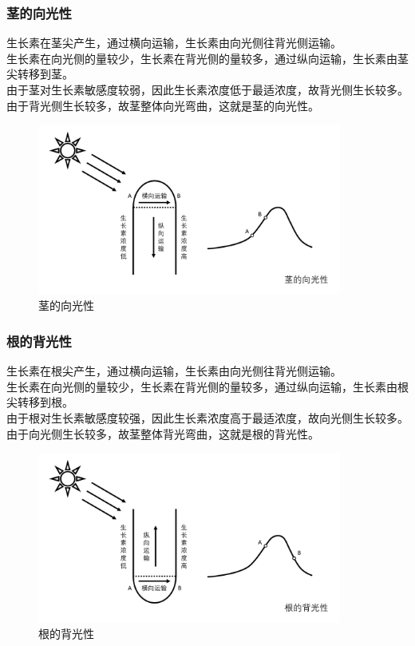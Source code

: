 \documentclass[UTF8]{ctexart}
\begin{document}
\newpage

\subsubsection{茎的向光性}
    生长素在茎尖产生，通过横向运输，生长素由向光侧往背光侧运输。\\[3mm]
    生长素在向光侧的量较少，生长素在背光侧的量较多，通过纵向运输，生长素由茎尖转移到茎。\\[3mm]
    由于茎对生长素敏感度较弱，因此生长素浓度低于最适浓度，故背光侧生长较多。\\[3mm]
    由于背光侧生长较多，故茎整体向光弯曲，这就是茎的向光性。
    \begin{figure}[h]
        \begin{center}
            \includegraphics[width=10cm]{BiologyImage/17.jpg}
            \caption{茎的向光性}
        \end{center}
    \end{figure}\vspace{-25pt}

\subsubsection{根的背光性}
    生长素在根尖产生，通过横向运输，生长素由向光侧往背光侧运输。\\[3mm]
    生长素在向光侧的量较少，生长素在背光侧的量较多，通过纵向运输，生长素由根尖转移到根。\\[3mm]
    由于根对生长素敏感度较强，因此生长素浓度高于最适浓度，故向光侧生长较多。\\[3mm]
    由于向光侧生长较多，故茎整体背光弯曲，这就是根的背光性。
    \begin{figure}[h]
        \begin{center}
            \includegraphics[width=10cm]{BiologyImage/18.jpg}
            \caption{根的背光性}
        \end{center}
    \end{figure}
\end{document}
